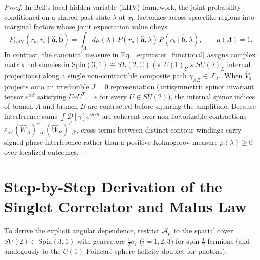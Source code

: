 \documentclass[11pt,a4paper]{article}
\begin{document}
\begin{proof}
In Bell's local hidden variable (LHV) framework, the joint probability conditioned on a shared past state $\lambda$ at $x_0$ factorizes across spacelike regions into marginal factors whose joint expectation value obeys
\begin{equation}
P_{\mathrm{LHV}}(r_a, r_b \mid \hat{\mathbf{a}}, \hat{\mathbf{b}}) = \int_\Lambda d\mu(\lambda) \, P(r_a \mid \hat{\mathbf{a}}, \lambda)\, P(r_b \mid \hat{\mathbf{b}}, \lambda), \qquad \mu(\Lambda) = 1.
\end{equation}
In contrast, the canonical measure in Eq.~\eqref{eq:master_functional} assigns complex matrix holonomies in $\mathrm{Spin}(3,1) \cong SL(2,\mathbb{C})$ (or $U(1)_Y \times SU(2)_L$ internal projections) along a single non-contractible composite path $\gamma_{AB} \in \mathcal{F}_\Sigma$. When $\hat{V}_0$ projects onto an irreducible $J=0$ representation (antisymmetric spinor invariant tensor $\varepsilon^{\alpha\beta}$ satisfying $U \varepsilon U^T = \varepsilon$ for every $U \in SU(2)$), the internal spinor indices of branch $A$ and branch $B$ are contracted before squaring the amplitude. Because interference sums $\int \mathcal{D}[\gamma] e^{i S/\hbar}$ are coherent over non-factorizable contractions $\varepsilon_{\alpha\beta} (\hat{W}_A)^\alpha{}_{\alpha'} (\hat{W}_B)^\beta{}_{\beta'}$, cross-terms between distinct contour windings carry signed phase interference rather than a positive Kolmogorov measure $\rho(\lambda) \ge 0$ over localized outcomes.
\end{proof}

\section{Step-by-Step Derivation of the Singlet Correlator and Malus Law}
To derive the explicit angular dependence, restrict $\mathbf{\mathcal{A}}_\mu$ to the spatial cover $SU(2) \subset \mathrm{Spin}(3,1)$ with generators $\frac{1}{2}\sigma_i$ ($i=1,2,3$) for spin-$\frac{1}{2}$ fermions (and analogously to the $U(1)$ Poincaré-sphere helicity doublet for photons).
\end{document}
